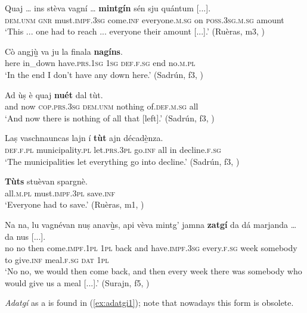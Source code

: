 \ea
\label{ex:mintgin1}
\gll Quaj … ins stèva vagní … \textbf{mintgín} sén sju quántum [...].\\
\textsc{dem.unm} {} \textsc{gnr} must.\textsc{impf.3sg} come.\textsc{inf} {} everyone.\textsc{m.sg} on \textsc{poss.3sg.m.sg} amount\\
\glt `This ... one had to reach ... everyone their amount [...].' (Ruèras, m3, )
\z

\ea
\label{ex:nagins1}
\gll  Cò angj{\`u̱̱} va ju la finala \textbf{nagíns}.  \\
here in\_down have.\textsc{prs.1sg} \textsc{1sg} \textsc{def.f.sg} end no.\textsc{m.pl}  \\
\glt `In the end I don’t have any down here.' (Sadrún, f3, )
\z

\ea
\label{ex:nuet1}
\gll  Ad ùṣ è quaj \textbf{nuét} dal tùt.   \\
and now \textsc{cop.prs.3sg} \textsc{dem.unm} nothing of.\textsc{def.m.sg} all\\
\glt `And now there is nothing of all that [left].' (Sadrún, f3, )
\z

\ea
\label{ex:tut1}
\gll Laṣ vaschnauncas lajn í \textbf{tùt} ajn décad{\`e̱}nza.\\
\textsc{def.f.pl} municipality.\textsc{pl} let.\textsc{prs.3pl} go.\textsc{inf} all in decline.\textsc{f.sg}  \\
\glt `The municipalities let everything go into decline.' (Sadrún, f3, )
\z

\ea
\label{ex:tuts2}
\gll    \textbf{Tùts} stuèvan spargnè.\\
all.\textsc{m.pl} must.\textsc{impf.3pl} save.\textsc{inf}\\
\glt `Everyone had to save.' (Ruèras, m1, )
\z

\ea
\label{ex:zatgi1}
 \gll Na na, lu vagnévan nuṣ anav{\`u̱̱}s, api vèva mintg’ jamna \textbf{zatgí} da dá marjanda … da nus [...].\\
 no no then come.\textsc{impf.1pl} \textsc{1pl} back and have.\textsc{impf.3sg} every.\textsc{f.sg}  week somebody to give.\textsc{inf} meal.\textsc{f.sg} {} \textsc{dat} \textsc{1pl}\\
 \glt `No no, we would then come back, and then every week there was somebody who would give us a meal [...].' (Surajn, f5, )
 \z 
 
\textit{Adatgí} as a  is found in  (\ref{ex:adatgi1}); note that nowadays this form is obsolete.


